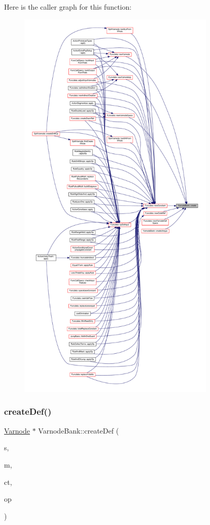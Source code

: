 Here is the caller graph for this function\+:
\nopagebreak
\begin{figure}[H]
\begin{center}
\leavevmode
\includegraphics[height=550pt]{class_varnode_bank_ae2effd128dce9205fba1015b45959f1c_icgraph}
\end{center}
\end{figure}
\mbox{\label{class_varnode_bank_a8acd91c7c2d886e404e531996f7962eb}} 
\subsubsection{\texorpdfstring{createDef()}{createDef()}}
{\footnotesize\ttfamily \mbox{\hyperlink{class_varnode}{Varnode}} $\ast$ Varnode\+Bank\+::create\+Def (\begin{DoxyParamCaption}\item[{int4}]{s,  }\item[{const \mbox{\hyperlink{class_address}{Address}} \&}]{m,  }\item[{\mbox{\hyperlink{class_datatype}{Datatype}} $\ast$}]{ct,  }\item[{\mbox{\hyperlink{class_pcode_op}{Pcode\+Op}} $\ast$}]{op }\end{DoxyParamCaption})}




